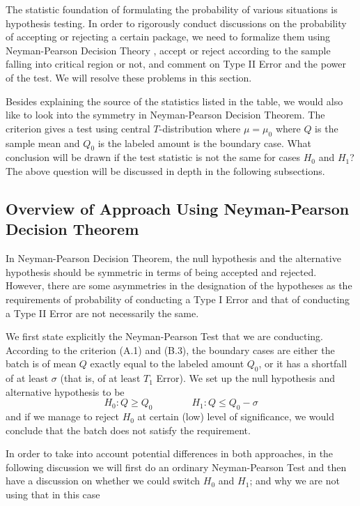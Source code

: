 \documentclass[12pt]{article}
\begin{document}
The statistic foundation of formulating the probability of various situations is hypothesis testing. In order to rigorously conduct discussions on the probability of accepting or rejecting a certain package, we need to formalize them using Neyman-Pearson Decision Theory \cite{Ho2023}, accept or reject according to the sample falling into critical region or not, and comment on Type II Error and the power of the test. We will resolve these problems in this section.

Besides explaining the source of the statistics listed in the table, we would also like to look into the symmetry in Neyman-Pearson Decision Theorem. The criterion gives a test using central $T$-distribution where $\mu=\mu_0$ where $Q$ is the sample mean and $Q_0$ is the labeled amount is the boundary case. What conclusion will be drawn if the test statistic is not the same for cases $H_0$ and $H_1$? The above question will be discussed in depth in the following subsections.

\subsection{Overview of Approach Using Neyman-Pearson Decision Theorem}

In Neyman-Pearson Decision Theorem, the null hypothesis and the alternative hypothesis should be symmetric in terms of being accepted and rejected. However, there are some asymmetries in the designation of the hypotheses as the requirements of probability of conducting a Type I Error and that of conducting a Type II Error are not necessarily the same. 

We first state explicitly the Neyman-Pearson Test that we are conducting. According to the criterion (A.1) and (B.3), the boundary cases are either the batch is of mean $Q$ exactly equal to the labeled amount $Q_0$, or it has a shortfall of at least $\sigma$ (that is, of at least $T_1$ Error). We set up the null hypothesis and alternative hypothesis to be
$$
H_0 : Q\geq Q_0 \quad\quad\quad\quad H_1 : Q\leq Q_0 - \sigma
$$
and if we manage to reject $H_0$ at certain (low) level of significance, we would conclude that the batch does not satisfy the requirement. 

In order to take into account potential differences in both approaches, in the following discussion we will first do an ordinary Neyman-Pearson Test and then have a discussion on whether we could switch $H_0$ and $H_1$; and why we are not using that in this case
\end{document}

